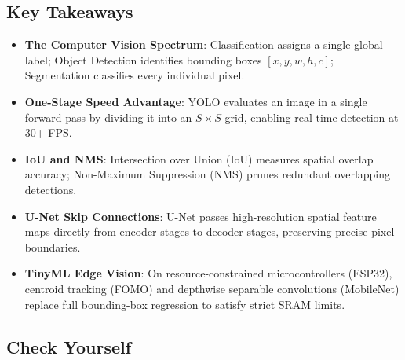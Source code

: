 \subsection{Key Takeaways}\label{subsec:takeaways}

\begin{takeaways}
\begin{itemize}
    \item \textbf{The Computer Vision Spectrum}: Classification assigns a single global label; Object Detection identifies bounding boxes $[x, y, w, h, c]$; Segmentation classifies every individual pixel.
    \item \textbf{One-Stage Speed Advantage}: YOLO evaluates an image in a single forward pass by dividing it into an $S \times S$ grid, enabling real-time detection at 30+ FPS.
    \item \textbf{IoU and NMS}: Intersection over Union (IoU) measures spatial overlap accuracy; Non-Maximum Suppression (NMS) prunes redundant overlapping detections.
    \item \textbf{U-Net Skip Connections}: U-Net passes high-resolution spatial feature maps directly from encoder stages to decoder stages, preserving precise pixel boundaries.
    \item \textbf{TinyML Edge Vision}: On resource-constrained microcontrollers (ESP32), centroid tracking (FOMO) and depthwise separable convolutions (MobileNet) replace full bounding-box regression to satisfy strict SRAM limits.
\end{itemize}
\end{takeaways}

\subsection{Check Yourself}\label{subsec:check_yourself}

